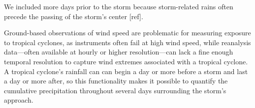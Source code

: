 We included more days prior to the storm because
storm-related rains often precede the passing of the storm's center [ref]. 

Ground-based observations of wind speed are problematic for measuring exposure
to tropical cyclones, as instruments often fail at high wind speed, while
reanalysis data---often available at hourly or higher resolution---can lack a
fine enough temporal resolution to capture wind extremes associated with a
tropical cyclone. 
A tropical cyclone's rainfall can can begin a day or more before a
storm and last a day or more after, so this functionality makes it possible to
quantify the cumulative precipitation throughout several days surrounding the
storm's approach. 
